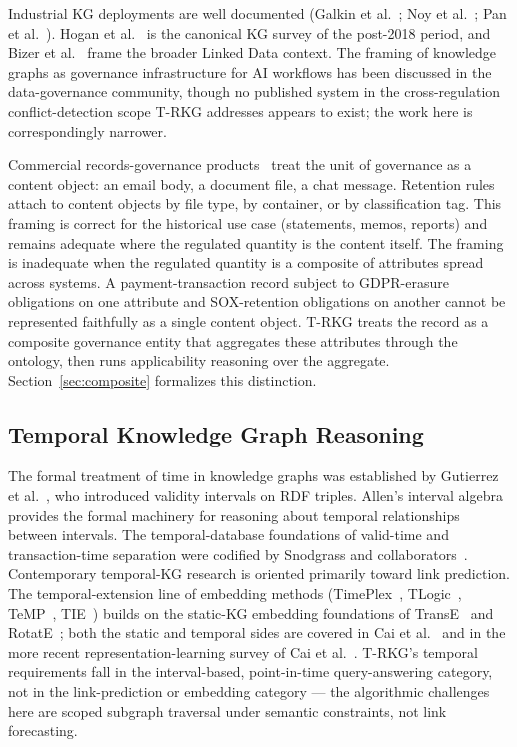 \documentclass{ieeeaccess}
\begin{document}
Industrial KG deployments are well documented (Galkin et al.~\cite{galkin2017}; Noy et al.~\cite{noy2019}; Pan et al.~\cite{pan2024}). Hogan et al.~\cite{hogan2021} is the canonical KG survey of the post-2018 period, and Bizer et al.~\cite{bizer2009,linkeddata} frame the broader Linked Data context. The framing of knowledge graphs as governance infrastructure for AI workflows has been discussed in the data-governance community, though no published system in the cross-regulation conflict-detection scope T-RKG addresses appears to exist; the work here is correspondingly narrower.

Commercial records-governance products~\cite{purview} treat the unit of governance as a content object: an email body, a document file, a chat message. Retention rules attach to content objects by file type, by container, or by classification tag. This framing is correct for the historical use case (statements, memos, reports) and remains adequate where the regulated quantity is the content itself. The framing is inadequate when the regulated quantity is a composite of attributes spread across systems. A payment-transaction record subject to GDPR-erasure obligations on one attribute and SOX-retention obligations on another cannot be represented faithfully as a single content object. T-RKG treats the record as a composite governance entity that aggregates these attributes through the ontology, then runs applicability reasoning over the aggregate. Section~\ref{sec:composite} formalizes this distinction.

\subsection{Temporal Knowledge Graph Reasoning}

The formal treatment of time in knowledge graphs was established by Gutierrez et al.~\cite{gutierrez2007}, who introduced validity intervals on RDF triples. Allen's interval algebra~\cite{allen1983} provides the formal machinery for reasoning about temporal relationships between intervals. The temporal-database foundations of valid-time and transaction-time separation were codified by Snodgrass and collaborators~\cite{snodgrass1995,jensen1997}. Contemporary temporal-KG research is oriented primarily toward link prediction. The temporal-extension line of embedding methods (TimePlex~\cite{timeplex}, TLogic~\cite{tlogic}, TeMP~\cite{temp}, TIE~\cite{tie}) builds on the static-KG embedding foundations of TransE~\cite{transe} and RotatE~\cite{rotate}; both the static and temporal sides are covered in Cai et al.~\cite{cai2023} and in the more recent representation-learning survey of Cai et al.~\cite{cai2024tkgsurvey}. T-RKG's temporal requirements fall in the interval-based, point-in-time query-answering category, not in the link-prediction or embedding category — the algorithmic challenges here are scoped subgraph traversal under semantic constraints, not link forecasting.
\end{document}
